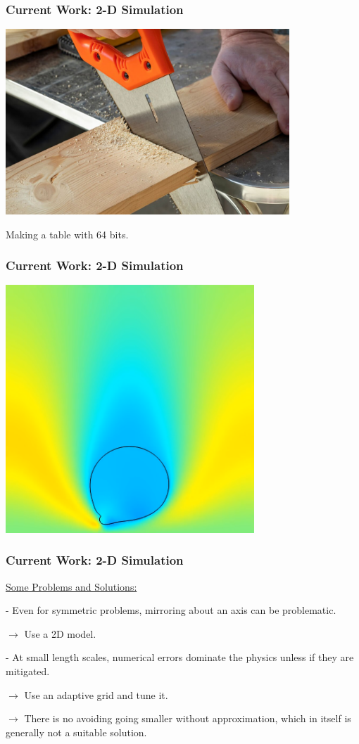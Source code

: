 \documentclass[12pt]{beamer}
\begin{document}
\begin{frame}
    \frametitle{Current Work: 2-D Simulation}

    \includegraphics[width=0.8\textwidth]{img/cuttingwood.jpg}

    Making a table with 64 bits.
\end{frame}
\begin{frame}
    \frametitle{Current Work: 2-D Simulation}

    \includegraphics[width=0.7\textwidth]{img/10-assymetry.png}
\end{frame}
\begin{frame}
    \frametitle{Current Work: 2-D Simulation}
    \underline{Some Problems and Solutions:}

    - Even for symmetric problems, mirroring about an axis can be problematic.

    $\rightarrow$ Use a 2D model.

    - At small length scales, numerical errors dominate the physics unless if 
    they are mitigated.

    $\rightarrow$ Use an adaptive grid and tune it.
    
    $\rightarrow$ There is no avoiding going smaller without approximation, 
    which in itself is generally not a suitable solution.
\end{frame}
\end{document}
